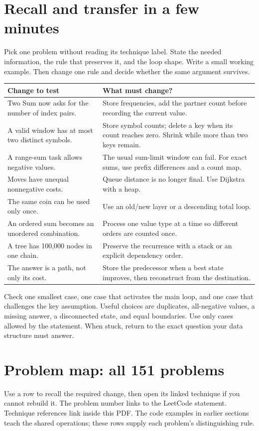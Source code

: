 \documentclass[11pt]{article}
\begin{document}
\section{Recall and transfer in a few minutes}\label{sec:recall}
Pick one problem without reading its technique label. State the needed information, the rule that preserves it, and the loop shape.
Write a small working example. Then change one rule and decide whether the same argument survives.

\begin{longtable}{@{}L{8cm}L{8cm}@{}}
\toprule Change to test & What must change? \\ \midrule\endhead
Two Sum now asks for the number of index pairs. & Store frequencies, add the partner count before recording the current value.\\
A valid window has at most two distinct symbols. & Store symbol counts; delete a key when its count reaches zero. Shrink while more than two keys remain.\\
A range-sum task allows negative values. & The usual sum-limit window can fail. For exact sums, use prefix differences and a count map.\\
Moves have unequal nonnegative costs. & Queue distance is no longer final. Use Dijkstra with a heap.\\
The same coin can be used only once. & Use an old/new layer or a descending total loop.\\
An ordered sum becomes an unordered combination. & Process one value type at a time so different orders are counted once.\\
A tree has 100,000 nodes in one chain. & Preserve the recurrence with a stack or an explicit dependency order.\\
The answer is a path, not only its cost. & Store the predecessor when a best state improves, then reconstruct from the destination.\\
\bottomrule
\end{longtable}
Check one smallest case, one case that activates the main loop, and one case that challenges the key assumption.
Useful choices are duplicates, all-negative values, a missing answer, a disconnected state, and equal boundaries.
Use only cases allowed by the statement.
When stuck, return to the exact question your data structure must answer.

\newpage
\section{Problem map: all 151 problems}\label{sec:map}
Use a row to recall the required change, then open its linked technique if you cannot rebuild it.
The problem number links to the LeetCode statement. Technique references link inside this PDF.
The code examples in earlier sections teach the shared operations; these rows supply each problem's distinguishing rule.
\end{document}
